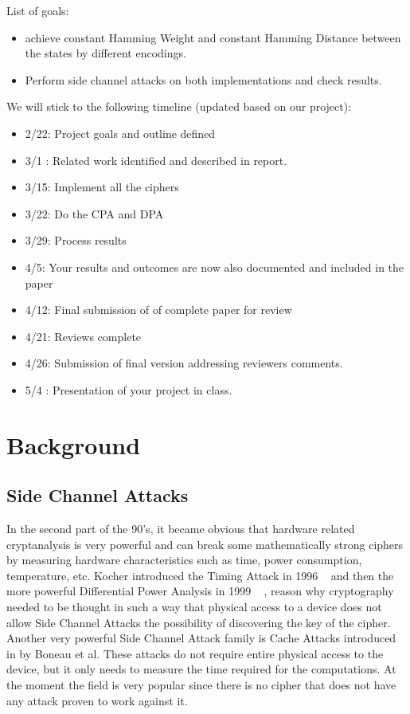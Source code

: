 \documentclass[conference]{IEEEtran}
\begin{document}
List of goals:
\begin{itemize}
        \item achieve constant Hamming Weight and constant Hamming Distance between the states by different encodings.
        \item Perform side channel attacks on both implementations and check results.
\end{itemize}


We will stick to the following timeline (updated based on our project):

\begin{itemize}
	\item 2/22: Project goals and outline defined
	\item 3/1 : Related work identified and described in report.
	\item 3/15: Implement all the ciphers
	\item 3/22: Do the CPA and DPA
	\item 3/29: Process results
	\item 4/5:  Your results and outcomes are now also documented and included in the paper
	\item 4/12: Final submission of of complete paper for review
	\item 4/21: Reviews complete
	\item 4/26: Submission of final version addressing reviewers comments.
	\item 5/4 : Presentation of your project in class.
\end{itemize}

\section{Background}\label{sec:background}

\subsection{Side Channel Attacks}

In the second part of the 90's, it became obvious that hardware related cryptanalysis is very powerful and can break some mathematically strong ciphers by measuring hardware characteristics such as time, power consumption, temperature, etc. Kocher introduced the Timing Attack in 1996 ~\cite{KocherTiming} and then the more powerful Differential Power Analysis in 1999 ~\cite{KocherDPA} , reason why cryptography needed to be thought in such a way that physical access to a device does not allow Side Channel Attacks the possibility of discovering the key of the cipher. Another very powerful Side Channel Attack family is Cache Attacks introduced in \cite{Boneau} by Boneau et al. These attacks do not require entire physical access to the device, but it only needs to measure the time required for the computations. At the moment the field is very popular since there is no cipher that does not have any attack proven to work against it. 
\end{document}
